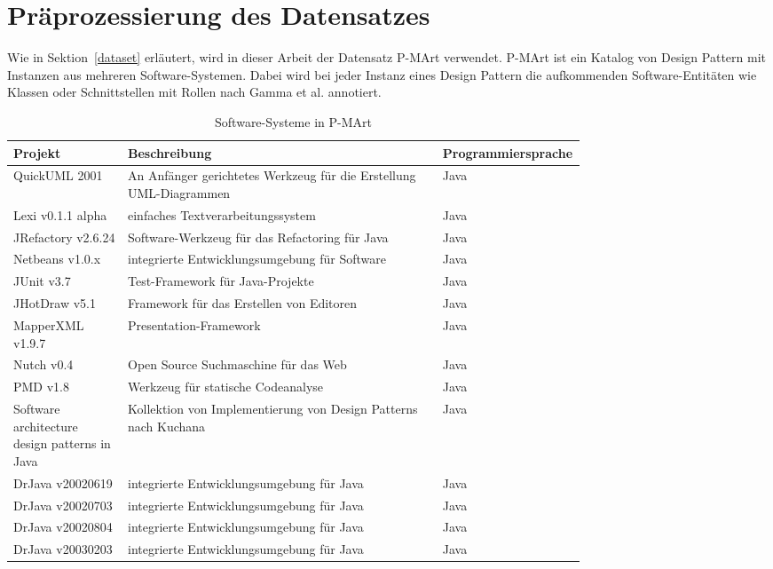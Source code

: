 \section{Präprozessierung des Datensatzes}\label{data_preprocessing}
Wie in Sektion~\ref{dataset} erläutert, wird in dieser Arbeit der Datensatz P-MArt verwendet.
P-MArt ist ein Katalog von Design Pattern mit Instanzen aus mehreren Software-Systemen. 
Dabei wird bei jeder Instanz eines Design Pattern die aufkommenden Software-Entitäten wie Klassen oder Schnittstellen mit Rollen nach Gamma et al. annotiert.

\begin{table}[H]
    \centering
    \begin{tabular}{|p{0.2\linewidth}|p{0.55\linewidth}|p{0,25\linewidth}|}
        \hline
        Projekt & Beschreibung & Programmiersprache\\
        \hline
        QuickUML 2001 & An Anfänger gerichtetes Werkzeug für die Erstellung UML-Diagrammen & Java\\
        Lexi v0.1.1 alpha & einfaches Textverarbeitungssystem & Java\\
        JRefactory v2.6.24 & Software-Werkzeug für das Refactoring für Java & Java\\
        Netbeans v1.0.x & integrierte Entwicklungsumgebung für Software & Java\\
        JUnit v3.7 & Test-Framework für Java-Projekte & Java\\
        JHotDraw v5.1 & Framework für das Erstellen von Editoren & Java\\
        MapperXML v1.9.7 & Presentation-Framework & Java\\
        Nutch v0.4 & Open Source Suchmaschine für das Web & Java\\
        PMD v1.8 & Werkzeug für statische Codeanalyse & Java\\
        Software architecture design patterns in Java & Kollektion von Implementierung von Design Patterns nach Kuchana~\cite{10.5555/983553} & Java\\
        DrJava v20020619 & integrierte Entwicklungsumgebung für Java & Java\\
        DrJava v20020703 & integrierte Entwicklungsumgebung für Java & Java\\
        DrJava v20020804 & integrierte Entwicklungsumgebung für Java & Java\\
        DrJava v20030203 & integrierte Entwicklungsumgebung für Java & Java\\
        \hline
    \end{tabular}
    \caption{Software-Systeme in P-MArt}
    \label{tab:pmart_projects}
\end{table}

